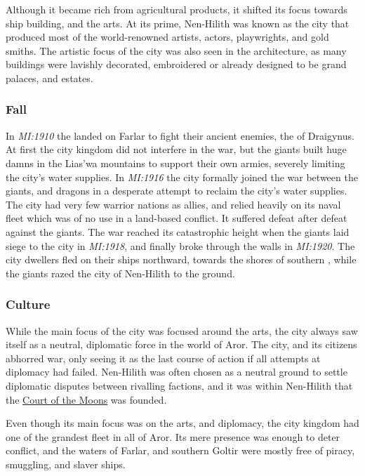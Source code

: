 Although it became rich from agricultural products, it shifted its focus
towards ship building, and the arts. At its prime, Nen-Hilith was known as the
city that produced most of the world-renowned artists, actors, playwrights,
and gold smiths. The artistic focus of the city was also seen in the
architecture, as many buildings were lavishly decorated, embroidered or
already designed to be grand palaces, and estates.

\subsubsection{Fall}

In \emph{MI:1910} the  landed on Farlar to fight their
ancient enemies, the  of Draigynus. At first the city
kingdom did not interfere in the war, but the giants built huge damns in
the Lias'wa mountains to support their own armies, severely limiting the
city's water supplies. In \emph{MI:1916} the city formally joined the war
between the giants, and dragons in a desperate attempt to reclaim the city's
water supplies. The city had very few warrior nations as allies, and
relied heavily on its naval fleet which was of no use in a land-based
conflict. It suffered defeat after defeat against the giants. The war reached
its catastrophic height when the giants laid siege to the city in
\emph{MI:1918}, and finally broke through the walls in \emph{MI:1920}. The
city dwellers fled on their ships northward, towards the shores of southern
, while the giants razed the city of Nen-Hilith to the
ground.

\subsubsection{Culture}

While the main focus of the city was focused around the arts, the city always
saw itself as a neutral, diplomatic force in the world of Aror. The city, and
its citizens abhorred war, only seeing it as the last course of action if all
attempts at diplomacy had failed. Nen-Hilith was often chosen as a neutral
ground to settle diplomatic disputes between rivalling factions, and it was
within Nen-Hilith that the \hyperref[sec:Two Courts]{Court of the Moons} was
founded.

Even though its main focus was on the arts, and diplomacy, the city kingdom
had one of the grandest fleet in all of Aror. Its mere presence was enough to
deter conflict, and the waters of Farlar, and southern Goltir were mostly free
of piracy, smuggling, and slaver ships.

